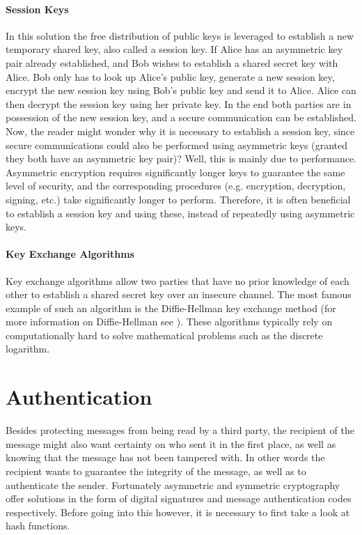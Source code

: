 \paragraph{Session Keys} In this solution the free distribution of public keys is leveraged to establish a new temporary shared key, also called a session key. If Alice has an asymmetric key pair already established, and Bob wishes to establish a shared secret key with Alice. Bob only has to look up Alice's public key, generate a new session key, encrypt the new session key using Bob's public key and send it to Alice. Alice can then decrypt the session key using her private key. In the end both parties are in possession of the new session key, and a secure communication can be established. Now, the reader might wonder why it is necessary to establish a session key, since secure communications could also be performed using asymmetric keys (granted they both have an asymmetric key pair)? Well, this is mainly due to performance. Asymmetric encryption requires significantly longer keys to guarantee the same level of security, and the corresponding procedures (e.g. encryption, decryption, signing, etc.) take significantly longer to perform. Therefore, it is often beneficial to establish a session key and using these, instead of repeatedly using asymmetric keys.

\paragraph{Key Exchange Algorithms} Key exchange algorithms allow two parties that have no prior knowledge of each other to establish a shared secret key over an insecure channel. The most famous example of such an algorithm is the Diffie-Hellman key exchange method (for more information on Diffie-Hellman see \cite{wiki:DH}). These algorithms typically rely on computationally hard to solve mathematical problems such as the discrete logarithm.

\section{Authentication} 
\label{sec:authentication}

Besides protecting messages from being read by a third party, the recipient of the message might also want certainty on who sent it in the first place, as well as knowing that the message has not been tampered with. In other words the recipient wants to guarantee the integrity of the message, as well as to authenticate the sender. Fortunately asymmetric and symmetric cryptography offer solutions in the form of digital signatures and message authentication codes respectively. Before going into this however, it is necessary to first take a look at hash functions.


